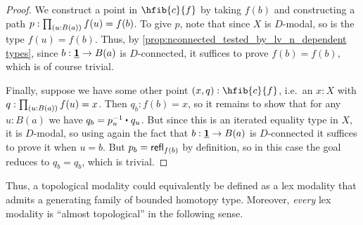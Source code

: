 \begin{proof}
  We construct a point in $\hfib{c}{f}$ by taking $f(b)$ and constructing a path $p:\prd{u:B(a)} f(u)=f(b)$.
  To give $p$, note that since $X$ is $D$-modal, so is the type $f(u)=f(b)$.
  Thus, by \cref{prop:nconnected_tested_by_lv_n_dependent types}, since $b:\underline{\mathbf{1}}\to B(a)$ is $D$-connected, it suffices to prove $f(b)=f(b)$, which is of course trivial.

  Finally, suppose we have some other point $(x,q) : \hfib{c}{f}$, i.e.\ an $x:X$ with $q:\prd{u:B(a)} f(u)=x$.
  Then $q_b : f(b) = x$, so it remains to show that for any $u:B(a)$ we have $q_b = \ct{p_u^{-1}}{q_u}$.
  But since this is an iterated equality type in $X$, it is $D$-modal, so using again the fact that $b:\underline{\mathbf{1}}\to B(a)$ is $D$-connected it suffices to prove it when $u=b$.
  But $p_b = \mathsf{refl}_{f(b)}$ by definition, so in this case the goal reduces to $q_b = q_b$, which is trivial.
\end{proof}

Thus, a topological modality could equivalently be defined as a lex modality that admits a generating family of bounded homotopy type.
Moreover, \emph{every} lex modality is ``almost topological'' in the following sense.

